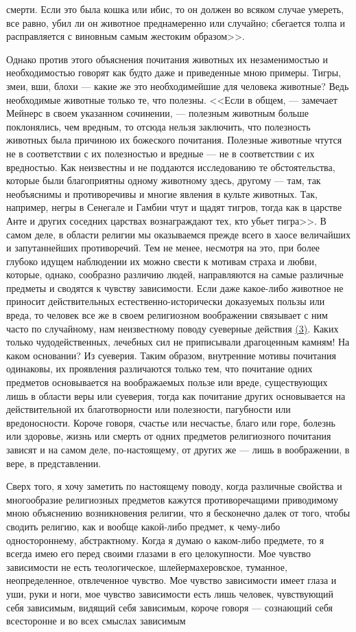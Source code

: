 \documentclass[12pt]{article}
\begin{document}
смерти. Если это была кошка или ибис, то он должен во всяком случае умереть, все равно, убил ли он животное преднамеренно или случайно; сбегается толпа и расправляется с виновным самым жестоким образом>>. 

Однако против этого объяснения почитания животных их незаменимостью и необходимостью говорят как будто даже и приведенные мною примеры. Тигры, змеи, вши, блохи --- какие же это необходимейшие для человека животные? Ведь необходимые животные только те, что полезны. <<Если в общем, --- замечает Мейнерс в своем указанном сочинении, --- полезным животным больше поклонялись, чем вредным, то отсюда нельзя заключить, что полезность животных была причиною их божеского почитания. Полезные животные чтутся не в соответствии с их полезностью и вредные --- не в соответствии с их вредностью. Как неизвестны и не поддаются исследованию те обстоятельства, которые были благоприятны одному животному здесь, другому --- там, так необъяснимы и противоречивы и многие явления в культе животных. Так, например, негры в Сенегале и Гамбии чтут и щадят тигров, тогда как в царстве Анте и других соседних царствах вознаграждают тех, кто убьет тигра>>. В самом деле, в области религии мы оказываемся прежде всего в хаосе величайших и запутаннейших противоречий. Тем не менее, несмотря на это, при более глубоко идущем наблюдении их можно свести к мотивам страха и любви, которые, однако, сообразно различию людей, направляются на самые различные предметы и сводятся к чувству зависимости. Если даже какое-либо животное не приносит действительных естественно-исторически доказуемых пользы или вреда, то человек все же в своем религиозном воображении связывает с ним часто по случайному, нам неизвестному поводу суеверные действия \hyperlink{3}{(3)}\hypertarget{b3}{}. Каких только чудодейственных, лечебных сил не приписывали драгоценным камням! На каком основании? Из суеверия. Таким образом, внутренние мотивы почитания одинаковы, их проявления различаются только тем, что почитание одних предметов основывается на воображаемых пользе или вреде, существующих лишь в области веры или суеверия, тогда как почитание других основывается на действительной их благотворности или полезности, пагубности или вредоносности. Короче говоря, счастье или несчастье, благо или горе, болезнь или здоровье, жизнь или смерть от одних предметов религиозного почитания зависят и на самом деле, по-настоящему, от других же --- лишь в воображении, в вере, в представлении. 

Сверх того, я хочу заметить по настоящему поводу, когда различные свойства и многообразие религиозных предметов кажутся противоречащими приводимому мною объяснению возникновения религии, что я бесконечно далек от того, чтобы сводить религию, как и вообще какой-либо предмет, к чему-либо одностороннему, абстрактному. Когда я думаю о каком-либо предмете, то я всегда имею его перед своими глазами в его целокупности. Мое чувство зависимости не есть теологическое, шлейермахеровское, туманное, неопределенное, отвлеченное чувство. Мое чувство зависимости имеет глаза и уши, руки и ноги, мое чувство зависимости есть лишь человек, чувствующий себя зависимым, видящий себя зависимым, короче говоря --- сознающий себя всесторонне и во всех смыслах зависимым 
\end{document}
